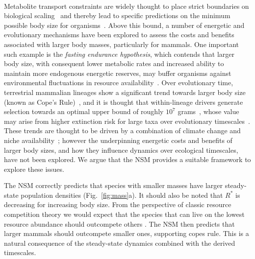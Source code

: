 \documentclass{pnastwo}
\begin{document}
\begin{article}
 \\
Metabolite transport constraints are widely thought to place strict
boundaries on biological
scaling~\cite{Brown:1993p708,West:1997cg,Brown:2004wq} and thereby lead to
specific predictions on the minimum possible body size for
organisms~\cite{West:2002ud}.  Above this bound, a number of energetic and
evolutionary mechanisms have been explored to assess the costs and benefits
associated with larger body masses, particularly for mammals.  One important
such example is the \emph{fasting endurance hypothesis}, which contends that
larger body size, with consequent lower metabolic rates and increased ability
to maintain more endogenous energetic reserves, may buffer organisms against
environmental fluctuations in resource availability~\cite{Millar:1990p923}.
Over evolutionary time, terrestrial mammalian lineages show a significant
trend towards larger body size (known as Cope's
Rule)~\cite{Alroy:1998p1594,Clauset:2009fh,Smith:2010p3442,Saarinen:2014br},
and it is thought that within-lineage drivers generate selection towards an
optimal upper bound of roughly $10^7$ grams~\cite{Alroy:1998p1594}, whose
value may arise from higher extinction risk for large taxa over evolutionary
timescales~\cite{Clauset:2009fh}.  These trends are thought to be driven by a
combination of climate change and niche availability~\cite{Saarinen:2014br};
however the underpinning energetic costs and benefits of larger body sizes,
and how they influence dynamics over ecological timescales, have not been
explored.  We argue that the NSM provides a suitable framework to explore
these issues.

The NSM correctly predicts that species with smaller masses have larger
steady-state population densities (Fig.~\ref{fig:mass}a). It should also be noted that $R^{*}$ is decreasing for increasing body size. From the perspective of classic resource competition theory we would expect that the species that can live on the lowest resource abundance should outcompete others \cite{tilman1981,dutkiewicz2009,barton2010}. The NSM then predicts that larger mammals should outcompete smaller ones, supporting copes rule. This is a natural consequence of the steady-state dynamics combined with the derived timescales. 


\end{article}
\end{document}
